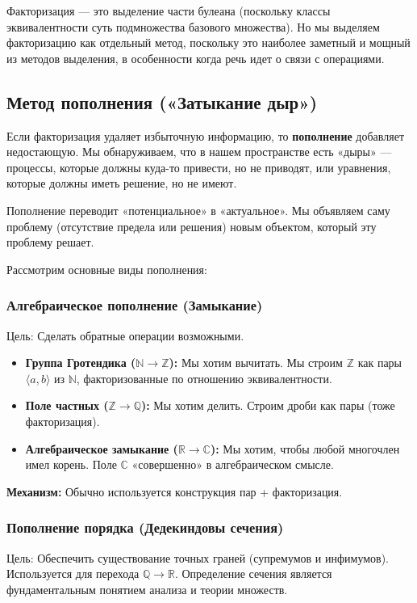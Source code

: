 \documentclass[11pt, a4paper]{extarticle}
\newcommand{\Z}{{\mathbb Z}}
\newcommand{\R}{{\mathbb R}}
\newcommand{\C}{{\mathbb C}}
\newcommand{\Q}{{\mathbb Q}}
\newcommand{\N}{{\mathbb N}}
\begin{document}
    \begin{remark}
    Факторизация --- это выделение части булеана (поскольку классы эквивалентности суть подмножества базового множества). Но мы выделяем факторизацию как отдельный метод, поскольку это наиболее заметный и мощный из методов выделения, в особенности когда речь идет о связи с операциями.
    \end{remark}

    
    \subsection{Метод пополнения («Затыкание дыр»)}

    Если факторизация удаляет избыточную информацию, то \textbf{пополнение} добавляет недостающую. Мы обнаруживаем, что в нашем пространстве есть «дыры» — процессы, которые должны куда-то привести, но не приводят, или уравнения, которые должны иметь решение, но не имеют.
    
    Пополнение переводит «потенциальное» в «актуальное». Мы объявляем саму проблему (отсутствие предела или решения) новым объектом, который эту проблему решает.
    
    
    Рассмотрим основные виды пополнения:
    
    \subsubsection{Алгебраическое пополнение (Замыкание)}
    Цель: Сделать обратные операции возможными.
    \begin{itemize}
        \item \textbf{Группа Гротендика ($\N \to \Z$):} Мы хотим вычитать. Мы строим $\Z$ как пары $\langle a, b\rangle$ из $\N$, факторизованные по отношению эквивалентности.
        \item \textbf{Поле частных ($\Z \to \Q$):} Мы хотим делить. Строим дроби как пары (тоже факторизация).
        \item \textbf{Алгебраическое замыкание ($\R \to \C$):} Мы хотим, чтобы любой многочлен имел корень. Поле $\C$ «совершенно» в алгебраическом смысле.
    \end{itemize}
    \textbf{Механизм:} Обычно используется конструкция пар + факторизация.
    
    \subsubsection{Пополнение порядка (Дедекиндовы сечения)}
    Цель: Обеспечить существование точных граней (супремумов и инфимумов).
    Используется для перехода $\Q \to \R$. Определение сечения является фундаментальным понятием анализа и теории множеств.
    
\end{document}
